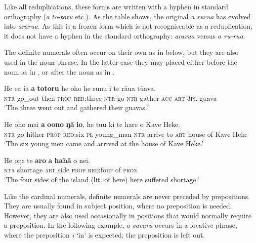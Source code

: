 
Like all reduplications, these forms are written with a hyphen in standard orthography (\textit{a to-toru} etc.). As the table shows, the original \textit{a rurua} has evolved into \textit{ararua}. As this is a frozen form which is not recogniseable as a reduplication, it does not have a hyphen in the standard orthography: \textit{ararua} versus \textit{a ru-rua}.

The definite numerals often occur on their own as in  below, but they are also used in the noun phrase. In the latter case they may placed either before the noun as in , or after the noun as in . 

\ea\label{ex:4.43}
\gll He e{\ꞌ}a ia \textbf{a} \textbf{totoru} he oho he runu i te rāua tūava. \\
\textsc{ntr} go\_out then \textsc{prop} \textsc{red}:three \textsc{ntr} go \textsc{ntr} gather \textsc{acc} \textsc{art} \textsc{3pl} guava \\

\glt 
‘The three went out and gathered their guavas.’ \textstyleExampleref{[R496.029]} 
\z

\ea\label{ex:4.44}
\gll He oho mai \textbf{a} \textbf{oono} \textbf{ŋā} \textbf{io}, he tu{\ꞌ}u ki te hare o Kave Heke. \\
\textsc{ntr} go hither \textsc{prop} \textsc{red}:six \textsc{pl} young\_man \textsc{ntr} arrive to \textsc{art} house of Kave Heke \\

\glt 
‘The six young men came and arrived at the house of Kave Heke.’ \textstyleExampleref{[Ley-4-01.007]}
\z

\ea\label{ex:4.45}
\gll He oŋe te \textbf{{\ꞌ}aro} \textbf{a} \textbf{hahā} o nei. \\
\textsc{ntr} shortage \textsc{art} side \textsc{prop} \textsc{red}:four of \textsc{prox} \\

\glt
‘The four sides of the island (lit. of here) here suffered shortage.’ \textstyleExampleref{[Mtx-5-02.017]}
\z

Like the cardinal numerals, definite numerals are never preceded by prepositions. They are usually found in subject position, where no preposition is needed. However, they are also used occasionally in positions that would normally require a preposition. In the following example, \textit{a vavaru} occurs in a locative phrase, where the preposition \textit{{\ꞌ}i} ‘in’ is expected; the preposition is left out.

